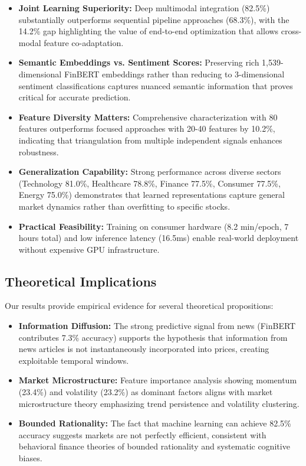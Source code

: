 \documentclass[conference]{IEEEtran}
\begin{document}
\begin{itemize}
\item \textbf{Joint Learning Superiority:} Deep multimodal integration (82.5\%) substantially outperforms sequential pipeline approaches (68.3\%), with the 14.2\% gap highlighting the value of end-to-end optimization that allows cross-modal feature co-adaptation.

\item \textbf{Semantic Embeddings vs. Sentiment Scores:} Preserving rich 1,539-dimensional FinBERT embeddings rather than reducing to 3-dimensional sentiment classifications captures nuanced semantic information that proves critical for accurate prediction.

\item \textbf{Feature Diversity Matters:} Comprehensive characterization with 80 features outperforms focused approaches with 20-40 features by 10.2\%, indicating that triangulation from multiple independent signals enhances robustness.

\item \textbf{Generalization Capability:} Strong performance across diverse sectors (Technology 81.0\%, Healthcare 78.8\%, Finance 77.5\%, Consumer 77.5\%, Energy 75.0\%) demonstrates that learned representations capture general market dynamics rather than overfitting to specific stocks.

\item \textbf{Practical Feasibility:} Training on consumer hardware (8.2 min/epoch, 7 hours total) and low inference latency (16.5ms) enable real-world deployment without expensive GPU infrastructure.
\end{itemize}

\subsection{Theoretical Implications}

Our results provide empirical evidence for several theoretical propositions:

\begin{itemize}
\item \textbf{Information Diffusion:} The strong predictive signal from news (FinBERT contributes 7.3\% accuracy) supports the hypothesis that information from news articles is not instantaneously incorporated into prices, creating exploitable temporal windows.

\item \textbf{Market Microstructure:} Feature importance analysis showing momentum (23.4\%) and volatility (23.2\%) as dominant factors aligns with market microstructure theory emphasizing trend persistence and volatility clustering.

\item \textbf{Bounded Rationality:} The fact that machine learning can achieve 82.5\% accuracy suggests markets are not perfectly efficient, consistent with behavioral finance theories of bounded rationality and systematic cognitive biases.
\end{itemize}
\end{document}
